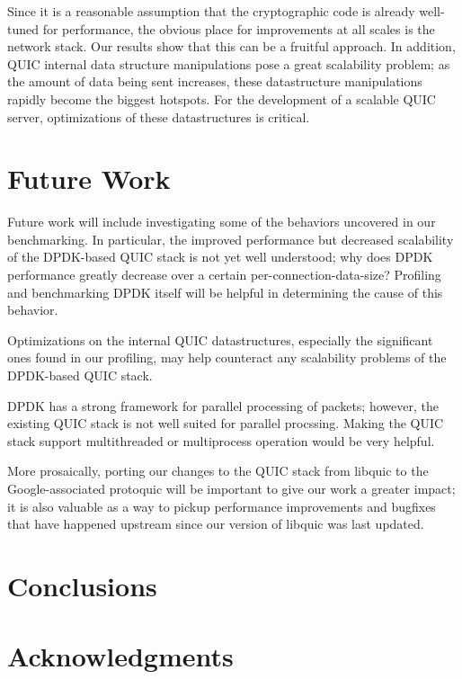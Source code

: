 \documentclass{sig-alternate-05-2015}
\begin{document}
Since it is a reasonable assumption that the cryptographic code is already well-tuned for performance, the obvious place for improvements at all scales is the network stack. Our results show that this can be a fruitful approach. In addition, QUIC internal data structure manipulations pose a great scalability problem; as the amount of data being sent increases, these datastructure manipulations rapidly become the biggest hotspots. For the development of a scalable QUIC server, optimizations of these datastructures is critical.

\section{Future Work}

Future work will include investigating some of the behaviors uncovered in our benchmarking.
In particular, the improved performance but decreased scalability of the DPDK-based QUIC stack
is not yet well understood;
why does DPDK performance greatly decrease over a certain per-connection-data-size?
Profiling and benchmarking DPDK itself will be helpful in determining the cause of this behavior.

Optimizations on the internal QUIC datastructures,
especially the significant ones found in our profiling,
may help counteract any scalability problems of the DPDK-based QUIC stack.

DPDK has a strong framework for parallel processing of packets;
however, the existing QUIC stack is not well suited for parallel procssing.
Making the QUIC stack support multithreaded or multiprocess operation would be very helpful.

More prosaically, porting our changes to the QUIC stack from libquic
to the Google-associated protoquic
will be important to give our work a greater impact;
it is also valuable as a way to pickup performance improvements and bugfixes that have happened upstream
since our version of libquic was last updated.

\section{Conclusions}


\section{Acknowledgments}





\end{document}
